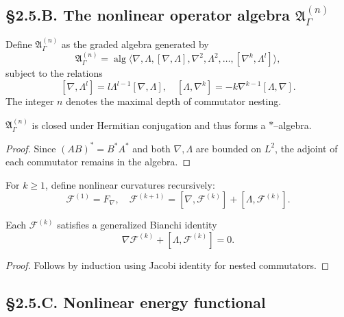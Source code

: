 \subsection*{§2.5.B. The nonlinear operator algebra $\mathfrak{A}_{\Gamma}^{(n)}$}

\begin{definition}
Define $\mathfrak{A}_{\Gamma}^{(n)}$ as the graded algebra generated by
\[
\mathfrak{A}_{\Gamma}^{(n)}=\operatorname{alg}\langle \nabla,\Lambda,[\nabla,\Lambda],\nabla^2,\Lambda^2,\ldots,[\nabla^k,\Lambda^l]\rangle,
\]
subject to the relations
\[
[\nabla,\Lambda^l]=l\Lambda^{l-1}[\nabla,\Lambda],\quad
[\Lambda,\nabla^k]=-k\nabla^{k-1}[\Lambda,\nabla].
\]
The integer $n$ denotes the maximal depth of commutator nesting.
\end{definition}

\begin{lemma}
$\mathfrak{A}_{\Gamma}^{(n)}$ is closed under Hermitian conjugation and thus forms a $*$–algebra.
\end{lemma}

\begin{proof}
Since $(AB)^\ast=B^\ast A^\ast$ and both $\nabla,\Lambda$ are bounded on $L^2$, the adjoint of each commutator remains in the algebra.
\end{proof}

\begin{definition}
For $k\ge1$, define nonlinear curvatures recursively:
\[
\mathcal{F}^{(1)}=F_\nabla,\quad 
\mathcal{F}^{(k+1)}=[\nabla,\mathcal{F}^{(k)}]+[\Lambda,\mathcal{F}^{(k)}].
\]
\]
\end{definition}

\begin{theorem}\label{thm:2.5.bianchi}
Each $\mathcal{F}^{(k)}$ satisfies a generalized Bianchi identity
\[
\nabla\mathcal{F}^{(k)}+[\Lambda,\mathcal{F}^{(k)}]=0.
\]
\end{theorem}

\begin{proof}
Follows by induction using Jacobi identity for nested commutators.
\end{proof}

\subsection*{§2.5.C. Nonlinear energy functional}

